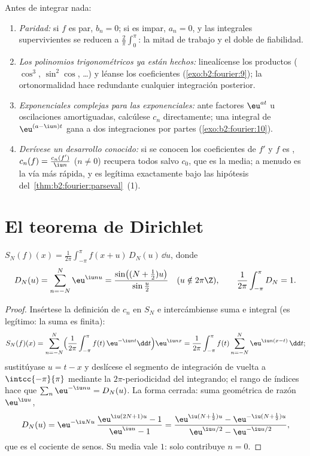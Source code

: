 \begin{method}\label{met:b2:fourier:coefficients}
Antes de integrar nada:
\begin{enumerate}
  \item \emph{Paridad:} si $f$ es par, $b_n = 0$; si es impar, $a_n
        = 0$, y las integrales supervivientes se reducen a
        $\frac2\pi \int_0^\pi$: la mitad de trabajo y el doble de
        fiabilidad.
  \item \emph{Los polinomios trigonométricos ya están hechos:}
        linealícense los productos ($\cos^3$, $\sin^2\cos$, \dots) y
        léanse los coeficientes (\cref{exo:b2:fourier:9}); la
        ortonormalidad hace redundante cualquier integración
        posterior.
  \item \emph{Exponenciales complejas para las exponenciales:} ante
        factores $\eu^{at}$ u oscilaciones amortiguadas, calcúlese
        $c_n$ directamente; una integral de $\eu^{(a - \iu n)t}$
        gana a dos integraciones por partes
        (\cref{exo:b2:fourier:10}).
  \item \emph{Derívese un desarrollo conocido:} si se conocen los
        coeficientes de $f'$ y $f$ es , $c_n(f) =
        \frac{c_n(f')}{\iu n}$ ($n \neq 0$) recupera todos salvo
        $c_0$, que es la media; a menudo es la vía más rápida, y es
        legítima exactamente bajo las hipótesis del~\cref{thm:b2:fourier:parseval}~(1).
\end{enumerate}
\end{method}

\section{El teorema de Dirichlet}

\begin{lemma}\label{lem:b2:fourier:kernel}
$S_N(f)(x) = \frac{1}{2\pi}\int_{-\pi}^{\pi} f(x + u)\,D_N(u)\,\dd
u$, donde
\[
D_N(u) = \sum_{n=-N}^{N} \eu^{\iu nu}
= \frac{\sin\bigl((N + \frac12)u\bigr)}{\sin\frac u2}
\quad (u \notin 2\pi\Z),
\qquad
\frac{1}{2\pi}\int_{-\pi}^{\pi} D_N = 1 .
\]
\end{lemma}

\begin{proof}
Insértese la definición de $c_n$ en $S_N$ e intercámbiense suma e
integral (es legítimo: la suma es finita):
\[
S_N(f)(x)
= \sum_{n=-N}^{N}\Bigl(\frac{1}{2\pi}\int_{-\pi}^{\pi}
f(t)\,\eu^{-\iu nt}\dd t\Bigr)\eu^{\iu nx}
= \frac{1}{2\pi}\int_{-\pi}^{\pi} f(t)
\sum_{n=-N}^{N}\eu^{\iu n(x-t)}\,\dd t ;
\]
sustitúyase $u = t - x$ y deslícese el segmento de integración de
vuelta a $\intcc{-\pi}{\pi}$ mediante la $2\pi$-periodicidad del
integrando; el rango  de índices hace que $\sum_n\eu^{-\iu
nu} = D_N(u)$. La forma cerrada: suma geométrica de razón $\eu^{\iu
u}$,
\[
D_N(u) = \eu^{-\iu Nu}\,\frac{\eu^{\iu(2N+1)u} - 1}{\eu^{\iu u} -
1}
= \frac{\eu^{\iu(N + \frac12)u} - \eu^{-\iu(N+\frac12)u}}
{\eu^{\iu u/2} - \eu^{-\iu u/2}} ,
\]
que es el cociente de senos. Su media vale $1$: solo contribuye $n =
0$.
\end{proof}

